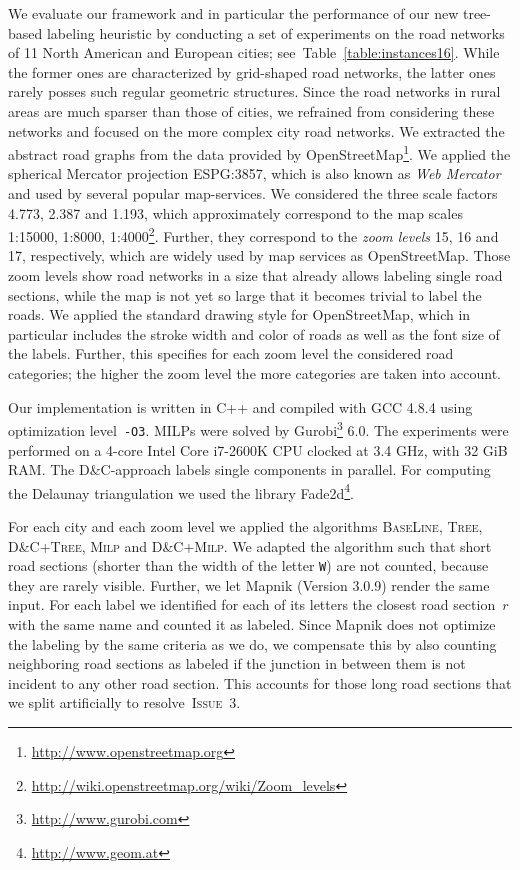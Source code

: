 \documentclass[a4paper,11pt]{article}
\newcommand{\ILong}{\textsc{Issue~3}\xspace}
\newcommand{\GreedyAlgo}{\textsc{Base\-Line}\xspace}
\newcommand{\TreeAlgo}{\textsc{Tree}\xspace}
\newcommand{\ILPAlgo}{\textsc{Milp}\xspace}
\newcommand{\Shredder}{\textsc{D\&C}}
\begin{document}
We evaluate our framework and in particular the performance of our new tree-based labeling heuristic by conducting a set of experiments on the road networks of 11 North American and European cities; see~Table~\ref{table:instances16}.
While the former ones are characterized by
grid-shaped road networks, the latter ones rarely posses such
regular geometric structures. 
Since the road networks in rural areas are
much sparser than those of cities, we refrained from considering these networks and focused on the more complex city road networks.  
We extracted the abstract road graphs from the data provided by
OpenStreetMap\footnote{\url{http://www.openstreetmap.org}}. We applied the spherical
Mercator projection ESPG:3857, which is also known as \emph{Web
  Mercator} and used by several popular map-services.  We considered
the three scale factors 4.773, 2.387 and 1.193, which approximately
correspond to the map scales 1:15000, 1:8000, 1:4000\footnote{\url{http://wiki.openstreetmap.org/wiki/Zoom\_levels}}. Further, they correspond to the
\emph{zoom levels} 15, 16 and 17, respectively, which are widely used
by map services as OpenStreetMap. Those zoom levels show road networks
in a size that already allows labeling single road sections, while the
map is not yet so large that it becomes trivial to label the
roads. We applied the standard drawing style for OpenStreetMap, which
in particular includes the stroke width and color of roads as well
as the font size of the labels. Further, this specifies for each zoom
level the considered road categories; the higher the zoom level the
more categories are taken into account.














Our implementation is written in C++ and compiled with GCC 4.8.4 using
optimization level~\texttt{-O3}. MILPs were solved by
Gurobi\footnote{\url{http://www.gurobi.com}} 6.0. The experiments were performed on a 4-core
Intel Core i7-2600K CPU clocked at 3.4 GHz, with 32 GiB RAM. The
\Shredder-approach labels single components in parallel. For computing
the Delaunay triangulation we used the library
Fade2d\footnote{\url{http://www.geom.at}}.

For each city and each zoom level we applied the algorithms
\GreedyAlgo, \TreeAlgo, \Shredder+\TreeAlgo, \ILPAlgo and
\Shredder+\ILPAlgo. We adapted the algorithm such that short road
sections (shorter than the width of the letter \texttt{W}) are not
counted, because they are rarely
visible. Further, we let Mapnik (Version 3.0.9) render the same
input. For each label we identified for each of its letters the
closest road section~$r$ with the same name and counted it as
labeled. Since Mapnik does not optimize the labeling by the same
criteria as we do, we compensate this by also counting neighboring road sections as labeled if the junction in between them is not incident to any other road section. This accounts for those long road sections that we split artificially to resolve~\ILong.
\end{document}
